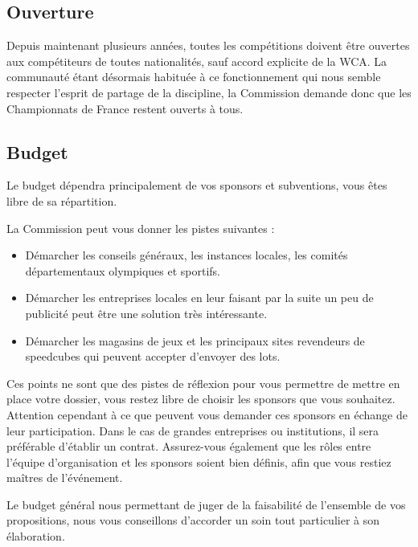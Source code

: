\documentclass[a4paper,12pt]{scrartcl}
\begin{document}
\subsection*{Ouverture}
Depuis maintenant plusieurs années, toutes les compétitions doivent être ouvertes aux compétiteurs de toutes nationalités, sauf accord explicite de la WCA. La communauté étant désormais habituée à ce fonctionnement qui nous semble respecter l'esprit de partage de la discipline, la Commission demande donc que les Championnats de France restent ouverts à tous.


\subsection*{Budget}

Le budget dépendra principalement de vos sponsors et subventions, vous êtes libre de sa répartition.

La Commission peut vous donner les pistes suivantes :

\begin{itemize}
    \item Démarcher les conseils généraux, les instances locales, les comités départementaux olympiques et sportifs.
    \item Démarcher les entreprises locales en leur faisant par la suite un peu de publicité peut être une solution très intéressante.
    \item Démarcher les magasins de jeux et les principaux sites revendeurs de speedcubes qui peuvent accepter d'envoyer des lots.
\end{itemize}

Ces points ne sont que des pistes de réflexion pour vous permettre de mettre en place votre dossier, vous restez libre de choisir les sponsors que vous souhaitez. 
Attention cependant à ce que peuvent vous demander ces sponsors en échange de leur participation. Dans le cas de grandes entreprises ou institutions, il sera préférable d'établir un contrat. Assurez-vous également que les rôles entre l'équipe d'organisation et les sponsors soient bien définis, afin que vous restiez maîtres de l'événement.

Le budget général nous permettant de juger de la faisabilité de l'ensemble de vos propositions, nous vous conseillons d'accorder un soin tout particulier à son élaboration.
\end{document}
